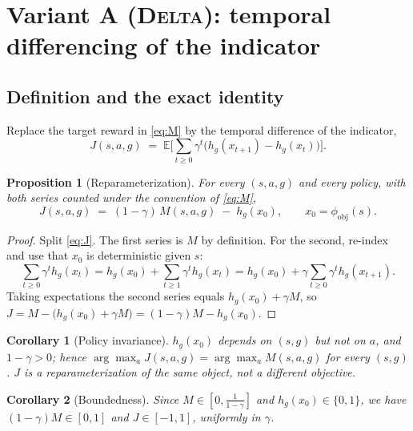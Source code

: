\documentclass{article}
\newtheorem{proposition}{Proposition}
\newtheorem{corollary}{Corollary}
\providecommand{\E}{\mathbb{E}}
\begin{document}
\section{Variant A (\textsc{Delta}): temporal differencing of the indicator}

\subsection{Definition and the exact identity}

Replace the target reward in \eqref{eq:M} by the temporal difference of the
indicator,
\begin{equation}
J(s,a,g) \;=\; \E\Big[\textstyle\sum_{t\ge0}\gamma^{t}
\big(h_g(x_{t+1})-h_g(x_{t})\big)\Big].
\label{eq:J}
\end{equation}

\begin{proposition}[Reparameterization]
\label{prop:identity}
For every $(s,a,g)$ and every policy, with both series counted under the
convention of \eqref{eq:M},
\begin{equation}
J(s,a,g) \;=\; (1-\gamma)\,M(s,a,g) \;-\; h_g(x_0),
\qquad x_0=\phi_{\mathrm{obj}}(s).
\label{eq:identity}
\end{equation}
\end{proposition}

\begin{proof}
Split \eqref{eq:J}. The first series is $M$ by definition. For the second,
re-index and use that $x_0$ is deterministic given $s$:
\[
\sum_{t\ge0}\gamma^{t}h_g(x_t)
= h_g(x_0)+\sum_{t\ge1}\gamma^{t}h_g(x_t)
= h_g(x_0)+\gamma\sum_{t\ge0}\gamma^{t}h_g(x_{t+1}).
\]
Taking expectations the second series equals $h_g(x_0)+\gamma M$, so
$J = M-\big(h_g(x_0)+\gamma M\big) = (1-\gamma)M-h_g(x_0)$.
\end{proof}

\begin{corollary}[Policy invariance]
\label{cor:argmax}
$h_g(x_0)$ depends on $(s,g)$ but not on $a$, and $1-\gamma>0$; hence
$\arg\max_{a} J(s,a,g) = \arg\max_{a} M(s,a,g)$ for every $(s,g)$. $J$ is a
reparameterization of the same object, not a different objective.
\end{corollary}

\begin{corollary}[Boundedness]
Since $M\in[0,\tfrac{1}{1-\gamma}]$ and $h_g(x_0)\in\{0,1\}$, we have
$(1-\gamma)M\in[0,1]$ and $J\in[-1,1]$, uniformly in $\gamma$.
\end{corollary}
\end{document}
